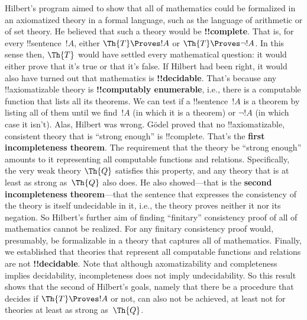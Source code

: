 Hilbert's program aimed to show that all of mathematics could be
formalized in an axiomatized theory in a formal language, such as the
language of arithmetic or of set theory.  He believed that such a
theory would be \textbf{!!{complete}}. That is, for every !!{sentence}~$!A$,
either $\Th{T} \Proves !A$ or $\Th{T} \Proves \lnot !A$. In this sense
then, $\Th{T}$ would have settled every mathematical question: it
would either prove that it's true or that it's false. If Hilbert had
been right, it would also have turned out that mathematics is
\textbf{!!{decidable}}. That's because any !!{axiomatizable} theory
is \textbf{!!{computably enumerable}}, i.e., there is a computable
function that lists all its theorems. We can test if a
!!{sentence}~$!A$ is a theorem by listing all of them until we
find~$!A$ (in which it is a theorem) or $\lnot !A$ (in which case it
isn't). Alas, Hilbert was wrong. G\"odel proved that no
!!{axiomatizable}, consistent theory that is ``strong enough'' is
!!{complete}. That's the \textbf{first incompleteness theorem}. The
requirement that the theory be ``strong enough'' amounts to it
representing all computable functions and relations.  Specifically,
the very weak theory $\Th{Q}$ satisfies this property, and any theory
that is at least as strong as~$\Th{Q}$ also does. He also
showed---that is the \textbf{second incompleteness theorem}---that the
sentence that expresses the consistency of the theory is itself
undecidable in it, i.e., the theory proves neither it nor its
negation. So Hilbert's further aim of finding ``finitary'' consistency
proof of all of mathematics cannot be realized. For any finitary
consistency proof would, presumably, be formalizable in a theory that
captures all of mathematics. Finally, we established that theories
that represent all computable functions and relations are
not \textbf{!!{decidable}}. Note that although axomatizability and
completeness implies decidability, incompleteness does not imply
undecidability.  So this result shows that the second of Hilbert's
goals, namely that there be a procedure that decides if
$\Th{T} \Proves !A$ or not, can also not be achieved, at least not for
theories at least as strong as~$\Th{Q}$.
